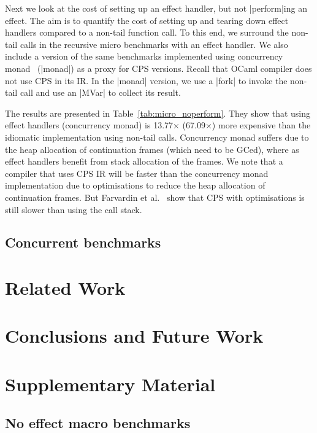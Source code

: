 \documentclass[sigplan,10pt,review,anonymous]{acmart}\settopmatter{printfolios=true,printccs=false,printacmref=false}
\begin{document}
Next we look at the cost of setting up an effect handler, but not |perform|ing
an effect. The aim is to quantify the cost of setting up and tearing down
effect handlers compared to a non-tail function call. To this end, we surround
the non-tail calls in the recursive micro benchmarks with an effect handler. We
also include a version of the same benchmarks implemented using concurrency
monad~\cite{} (|monad|) as a proxy for CPS versions. Recall that OCaml compiler
does not use CPS in its IR. In the |monad| version, we use a |fork| to invoke
the non-tail call and use an |MVar| to collect its result.

The results are presented in Table~\ref{tab:micro_noperform}. They show that
using effect handlers (concurrency monad) is 13.77$\times$ (67.09$\times$) more
expensive than the idiomatic implementation using non-tail calls. Concurrency
monad suffers due to the heap allocation of continuation frames (which need to
be GCed), where as effect handlers benefit from stack allocation of the frames.
We note that a compiler that uses CPS IR will be faster than the concurrency
monad implementation due to optimisations to reduce the heap allocation of
continuation frames. But Farvardin et al.~\cite{} show that CPS with
optimisations is still slower than using the call stack.

\subsection{Concurrent benchmarks}

\section{Related Work}
\label{sec:related}

\section{Conclusions and Future Work}
\label{sec:conc}




\newpage

\section*{Supplementary Material}
\setcounter{figure}{0}

\subsection*{No effect macro benchmarks}
\end{document}
